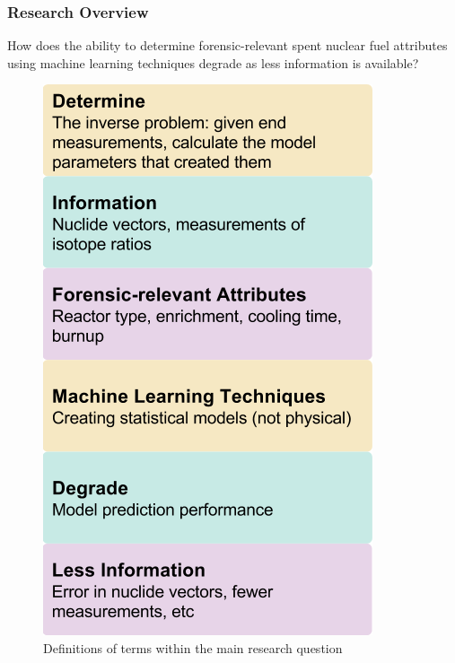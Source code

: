 \begin{frame}
  \frametitle{Research Overview}
  \begin{minipage}{0.5\textwidth}
    How does the ability to determine forensic-relevant spent nuclear fuel
    attributes using machine learning techniques degrade as less information is
    available?
    \vspace*{2cm}
  \end{minipage}%
  \begin{minipage}{0.5\textwidth}
    \begin{figure}
      \centering
      \includegraphics[height=0.75\textheight]{./figures/overview.png}
      \caption{Definitions of terms within the main research question}
    \end{figure}
  \end{minipage}
\end{frame}

